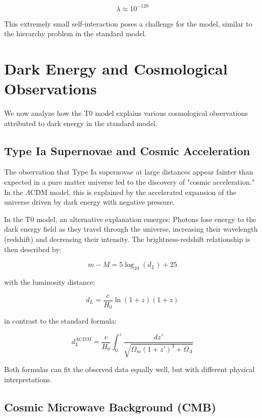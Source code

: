 \documentclass[a4paper,12pt]{article}
\begin{document}
\begin{equation}
	\lambda \approx 10^{-120}
\end{equation}

This extremely small self-interaction poses a challenge for the model, similar to the hierarchy problem in the standard model.

\section{Dark Energy and Cosmological Observations}

We now analyze how the T0 model explains various cosmological observations attributed to dark energy in the standard model.

\subsection{Type Ia Supernovae and Cosmic Acceleration}

The observation that Type Ia supernovae at large distances appear fainter than expected in a pure matter universe led to the discovery of "cosmic acceleration." In the $\Lambda$CDM model, this is explained by the accelerated expansion of the universe driven by dark energy with negative pressure.

In the T0 model, an alternative explanation emerges: Photons lose energy to the dark energy field as they travel through the universe, increasing their wavelength (redshift) and decreasing their intensity. The brightness-redshift relationship is then described by:

\begin{equation}
	m - M = 5 \log_{10}(d_L) + 25
\end{equation}

with the luminosity distance:

\begin{equation}
	d_L = \frac{c}{H_0} \ln(1+z) (1+z)
\end{equation}

in contrast to the standard formula:

\begin{equation}
	d_L^{\Lambda CDM} = \frac{c}{H_0} \int_0^z \frac{dz'}{\sqrt{\Omega_m(1+z')^3 + \Omega_\Lambda}}
\end{equation}

Both formulas can fit the observed data equally well, but with different physical interpretations.

\subsection{Cosmic Microwave Background (CMB)}
\end{document}
